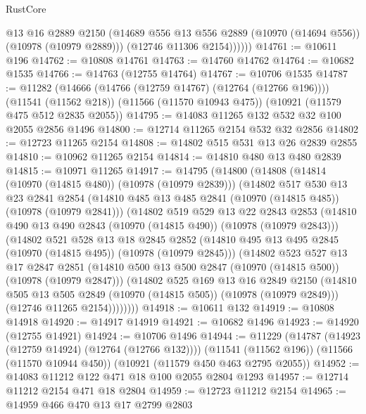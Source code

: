 \begin{lexlean}{RustCore}
\begin{coremodule}
              @13
              @16
              @2889
              @2150
              (@14689 @556 @13 @556 @2889 (@10970 (@14694 @556)) (@10978 (@10979 @2889)))
              (@12746 @11306 @2154))))))
@14761 := @10611 @196
@14762 := @10808 @14761
@14763 := @14760 @14762
@14764 := @10682 @1535
@14766 := @14763 (@12755 @14764)
@14767 := @10706 @1535
@14787 := @11282
    (@14666 (@14766 (@12759 @14767) (@12764 (@12766 @196))))
    (@11541 (@11562 @218))
    (@11566 (@11570 @10943 @475))
    (@10921 (@11579 @475 @512 @2835 @2055))
@14795 := @14083 @11265 @132 @532 @32 @100 @2055 @2856 @1496
@14800 := @12714 @11265 @2154 @532 @32 @2856
@14802 := @12723 @11265 @2154
@14808 := @14802 @515 @531 @13 @26 @2839 @2855
@14810 := @10962 @11265 @2154
@14814 := @14810 @480 @13 @480 @2839
@14815 := @10971 @11265
@14917 := @14795
    (@14800
      (@14808
        (@14814 (@10970 (@14815 @480)) (@10978 (@10979 @2839)))
        (@14802
          @517
          @530
          @13
          @23
          @2841
          @2854
          (@14810 @485 @13 @485 @2841 (@10970 (@14815 @485)) (@10978 (@10979 @2841)))
          (@14802
            @519
            @529
            @13
            @22
            @2843
            @2853
            (@14810 @490 @13 @490 @2843 (@10970 (@14815 @490)) (@10978 (@10979 @2843)))
            (@14802
              @521
              @528
              @13
              @18
              @2845
              @2852
              (@14810 @495 @13 @495 @2845 (@10970 (@14815 @495)) (@10978 (@10979 @2845)))
              (@14802
                @523
                @527
                @13
                @17
                @2847
                @2851
                (@14810 @500 @13 @500 @2847 (@10970 (@14815 @500)) (@10978 (@10979 @2847)))
                (@14802
                  @525
                  @169
                  @13
                  @16
                  @2849
                  @2150
                  (@14810 @505 @13 @505 @2849 (@10970 (@14815 @505)) (@10978 (@10979 @2849)))
                  (@12746 @11265 @2154))))))))
@14918 := @10611 @132
@14919 := @10808 @14918
@14920 := @14917 @14919
@14921 := @10682 @1496
@14923 := @14920 (@12755 @14921)
@14924 := @10706 @1496
@14944 := @11229
    (@14787 (@14923 (@12759 @14924) (@12764 (@12766 @132))))
    (@11541 (@11562 @196))
    (@11566 (@11570 @10944 @450))
    (@10921 (@11579 @450 @463 @2795 @2055))
@14952 := @14083 @11212 @122 @471 @18 @100 @2055 @2804 @1293
@14957 := @12714 @11212 @2154 @471 @18 @2804
@14959 := @12723 @11212 @2154
@14965 := @14959 @466 @470 @13 @17 @2799 @2803

\end{coremodule}
\end{lexlean}

